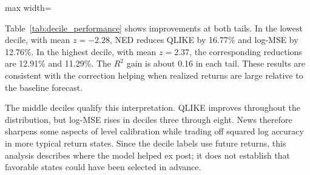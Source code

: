 \begin{table}[htbp]
\centering\small
\caption{Forecast performance by standardized-return decile (4-Hour RV, BTC)}
\label{tab:decile_performance}
\begin{adjustbox}{max width=\textwidth}\end{adjustbox}
\end{table}

Table~\ref{tab:decile_performance} shows improvements at both tails.
In the lowest decile, with mean $z=-2.28$, NED reduces QLIKE by
16.77\% and log-MSE by 12.76\%. In the highest decile, with mean
$z=2.37$, the corresponding reductions are 12.91\% and 11.29\%.
The $R^2$ gain is about 0.16 in each tail. These results are
consistent with the correction helping when realized returns are
large relative to the baseline forecast.

The middle deciles qualify this interpretation. QLIKE improves
throughout the distribution, but log-MSE rises in deciles three
through eight. News therefore sharpens some aspects of level
calibration while trading off squared log accuracy in more typical
return states. Since the decile labels use future returns, this
analysis describes where the model helped ex post; it does not
establish that favorable states could have been selected in advance.
